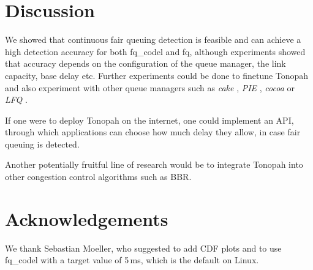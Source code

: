 \documentclass[conference]{IEEEtran}
\begin{document}
\section{Discussion}

We showed that continuous fair queuing detection is feasible and can achieve a high detection accuracy for both fq\_codel and fq, although experiments showed that accuracy depends on the configuration of the queue manager, 
the link capacity, base delay etc. Further experiments could be done to finetune Tonopah and also experiment with other queue managers such as \textit{cake} \cite{hoiland-jorgensen_piece_2018}, \textit{PIE} \cite{pan_pie_2013}, \textit{cocoa} \cite{bachl_cocoa_2019} or \textit{LFQ} \cite{bachl_lfq_2020}. 

If one were to deploy Tonopah on the internet, one could implement an API, through which applications can choose how much delay they allow, in case fair queuing is detected. 

Another potentially fruitful line of research would be to integrate Tonopah into other congestion control algorithms such as BBR. 

\section*{Acknowledgements}

We thank Sebastian Moeller, who suggested to add CDF plots and to use fq\_codel with a target value of 5\,ms, which is the default on Linux. 



\end{document}
